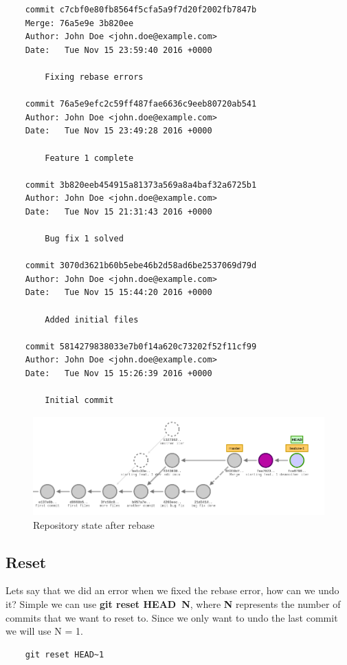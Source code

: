 \documentclass{article}
\begin{document}
\begin{lstlisting}
	commit c7cbf0e80fb8564f5cfa5a9f7d20f2002fb7847b
	Merge: 76a5e9e 3b820ee
	Author: John Doe <john.doe@example.com>
	Date:   Tue Nov 15 23:59:40 2016 +0000

    	Fixing rebase errors

	commit 76a5e9efc2c59ff487fae6636c9eeb80720ab541
	Author: John Doe <john.doe@example.com>
	Date:   Tue Nov 15 23:49:28 2016 +0000

    	Feature 1 complete

	commit 3b820eeb454915a81373a569a8a4baf32a6725b1
	Author: John Doe <john.doe@example.com>
	Date:   Tue Nov 15 21:31:43 2016 +0000

    	Bug fix 1 solved

	commit 3070d3621b60b5ebe46b2d58ad6be2537069d79d
	Author: John Doe <john.doe@example.com>
	Date:   Tue Nov 15 15:44:20 2016 +0000

    	Added initial files

	commit 5814279838033e7b0f14a620c73202f52f11cf99
	Author: John Doe <john.doe@example.com>
	Date:   Tue Nov 15 15:26:39 2016 +0000

    	Initial commit
\end{lstlisting}

\begin{figure}[H]
\centerline{\includegraphics[scale=0.5]{repository_after_rebase.png}}
\caption{Repository state after rebase}
\label{fig1}
\end{figure}

\subsection{Reset}

Lets say that we did an error when we fixed the rebase error, how can we undo it? Simple we can use \textbf{git reset HEAD~N}, where \textbf{N} represents the number of commits that we want to reset to. Since we only want to undo the last commit we will use N = 1.

\begin{lstlisting}
	git reset HEAD~1
\end{lstlisting}
\end{document}
